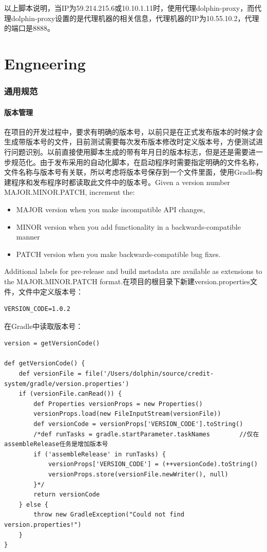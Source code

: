 \documentclass[letter]{book}
\begin{document}
以上脚本说明，当IP为59.214.215.6或10.10.1.11时，使用代理dolphin-proxy，而代理dolphin-proxy设置的是代理机器的相关信息，代理机器的IP为10.55.10.2，代理的端口是8888。

\part{Engneering}

\section{通用规范}

\subsection{版本管理}

在项目的开发过程中，要求有明确的版本号，以前只是在正式发布版本的时候才会生成带版本号的文件，目前测试需要每次发布版本修改时定义版本号，方便测试进行问题识别。以前直接使用脚本生成的带有年月日的版本标志，但是还是需要进一步规范化。由于发布采用的自动化脚本，在启动程序时需要指定明确的文件名称，文件名称与版本号有关联，所以考虑将版本号保存到一个文件里面，使用Gradle构建程序和发布程序时都读取此文件中的版本号。Given a version number MAJOR.MINOR.PATCH, increment the:

\begin{itemize}
	\item{MAJOR version when you make incompatible API changes,}
    \item{MINOR version when you add functionality in a backwards-compatible manner}
	\item{PATCH version when you make backwards-compatible bug fixes.}
\end{itemize}

Additional labels for pre-release and build metadata are available as extensions to the MAJOR.MINOR.PATCH format.在项目的根目录下新建version.properties文件，文件中定义版本号：

\begin{lstlisting}
VERSION_CODE=1.0.2
\end{lstlisting}

在Gradle中读取版本号：

\begin{lstlisting}
version = getVersionCode()

def getVersionCode() {
	def versionFile = file('/Users/dolphin/source/credit-system/gradle/version.properties')
	if (versionFile.canRead()) {
		def Properties versionProps = new Properties()
		versionProps.load(new FileInputStream(versionFile))
		def versionCode = versionProps['VERSION_CODE'].toString()
		/*def runTasks = gradle.startParameter.taskNames        //仅在assembleRelease任务是增加版本号
		if ('assembleRelease' in runTasks) {
			versionProps['VERSION_CODE'] = (++versionCode).toString()
			versionProps.store(versionFile.newWriter(), null)
		}*/
		return versionCode
	} else {
		throw new GradleException("Could not find version.properties!")
	}
}
\end{lstlisting}
\end{document}
